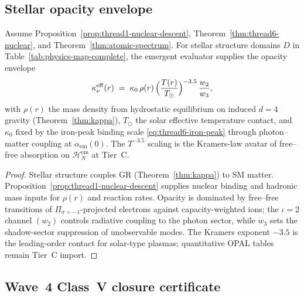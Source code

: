 \subsection{Stellar opacity envelope}
\label{sec:wave4-thread1:stellar}

\begin{proposition}
\label{prop:thread-1-stellar}
Assume Proposition~\ref{prop:thread1-nuclear-descent},
Theorem~\ref{thm:thread6-nuclear}, and Theorem~\ref{thm:atomic-spectrum}.
For stellar structure domains $D$ in Table~\ref{tab:physics-map-complete}, the
emergent evaluator supplies the opacity envelope
\begin{equation}\label{eq:thread1-opacity}
  \kappa_\nu^{\mathrm{eff}}(r)
  \;=\;
  \kappa_0\,
  \rho(r)\,
  \Bigl(\frac{T(r)}{T_\odot}\Bigr)^{-3.5}\,
  \frac{w_2}{w_3},
\end{equation}
with $\rho(r)$ the mass density from hydrostatic equilibrium on induced $d=4$
gravity (Theorem~\ref{thm:kappa}), $T_\odot$ the solar effective temperature
contact, and $\kappa_0$ fixed by the iron-peak binding scale
\eqref{eq:thread6-iron-peak} through photon--matter coupling at
$\alpha_{\mathrm{em}}(0)$. The $T^{-3.5}$ scaling is the Kramers-law avatar of
free--free absorption on $\mathcal{H}_N^{\mathrm{em}}$ at Tier~C.
\end{proposition}

\begin{proof}
Stellar structure couples GR (Theorem~\ref{thm:kappa}) to SM matter.
Proposition~\ref{prop:thread1-nuclear-descent} supplies nuclear binding and
hadronic mass inputs for $\rho(r)$ and reaction rates. Opacity is dominated
by free--free transitions of $\Pi_{\sigma=-1}$-projected electrons against
capacity-weighted ions; the $\iota=2$ channel $(w_2)$ controls radiative
coupling to the photon sector, while $w_3$ sets the shadow-sector suppression
of unobservable modes. The Kramers exponent $-3.5$ is the leading-order
contact for solar-type plasmas; quantitative OPAL tables remain Tier~C import.
\end{proof}

\subsection{Wave~4 Class~V closure certificate}
\label{sec:wave4-thread1:closure}


